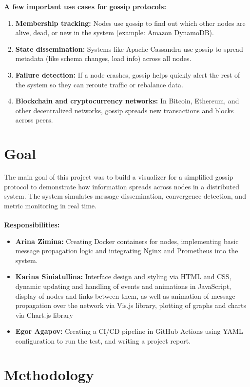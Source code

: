 \documentclass[a4paper,12pt]{article}
\begin{document}
\textbf{A few important use cases for gossip protocols:}
\begin{enumerate}
    \item \textbf{Membership tracking:} Nodes use gossip to find out which other nodes are alive, dead, or new in the system (example: Amazon DynamoDB).
    \item \textbf{State dissemination:} Systems like Apache Cassandra use gossip to spread metadata (like schema changes, load info) across all nodes.
    \item \textbf{Failure detection:} If a node crashes, gossip helps quickly alert the rest of the system so they can reroute traffic or rebalance data.
    \item \textbf{Blockchain and cryptocurrency networks:} In Bitcoin, Ethereum, and other decentralized networks, gossip spreads new transactions and blocks across peers.
\end{enumerate}

\section{Goal}

The main goal of this project was to build a visualizer for a simplified gossip protocol to demonstrate how information spreads across nodes in a distributed system. The system simulates message dissemination, convergence detection, and metric monitoring in real time.\\\\
\textbf{Responsibilities:}
\begin{itemize}
    \item \textbf{Arina Zimina:} Creating Docker containers for nodes, implementing basic message propagation logic and integrating Nginx and Prometheus into the system.
    \item \textbf{Karina Siniatullina:} Interface design and styling via HTML and CSS, dynamic updating and handling of events and animations in JavaScript, display of nodes and links between them, as well as animation of message propagation over the network via Vis.js library, plotting of graphs and charts via Chart.js library
    \item \textbf{Egor Agapov:} Creating a CI/CD pipeline in GitHub Actions using YAML configuration to run the test, and writing a project report.
\end{itemize}

\section{Methodology}
\end{document}
